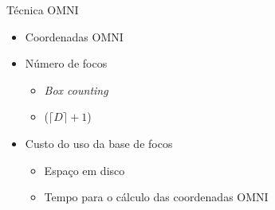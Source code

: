 \documentclass{beamer}
\begin{document}
\begin{frame}{Técnica OMNI}
  
  \begin{itemize}
    
   \item Coordenadas OMNI \newline
   
   \item Número de focos
      \begin{itemize}
	\item \textit{Box counting}\newline
	\item ($\lceil D \rceil +1$) \newline
      \end{itemize}
   
    \item Custo do uso da base de focos
      \begin{itemize}
	\item Espaço em disco\newline
	\item Tempo para o cálculo das coordenadas OMNI
      \end{itemize}	
  \end{itemize}

 
\end{frame}
\end{document}
